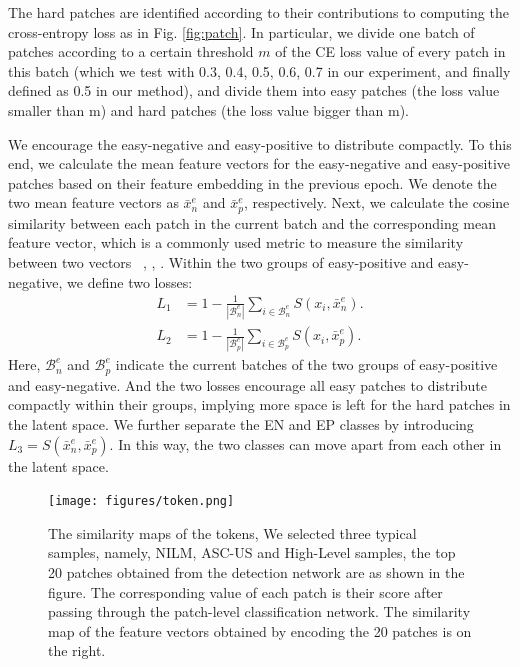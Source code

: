 The hard patches are identified according to their contributions to computing the cross-entropy loss as in Fig. \ref{fig:patch}. 
In particular, we divide one batch of patches according to a certain threshold $m$  of the CE loss value of every patch in this batch (which we test with 0.3, 0.4, 0.5, 0.6, 0.7 in our experiment, and finally defined as 0.5 in our method), and divide them into easy patches (the loss value smaller than m) and hard patches (the loss value bigger than m).

We encourage the easy-negative and easy-positive to distribute compactly. 
To this end, we calculate the mean feature vectors for the easy-negative and easy-positive patches based on their feature embedding in the previous epoch. 
We denote the two mean feature vectors as $\bar{x}^e_{n}$ and $\bar{x}^e_{p}$, respectively.
Next, we calculate the cosine similarity between each patch in the current batch and the corresponding mean feature vector, which is a commonly used metric to measure the similarity between two vectors ~\cite{nguyen2010cosine}, \cite{zhang2022whole}, \cite{cao2022parallel}. Within the two groups of easy-positive and easy-negative, we define two losses:
\begin{equation}
    \begin{aligned}
        L_{1}&=1-\frac{1}{|\mathcal{B}^e_{n}|}\sum_{i \in {\mathcal{B}^e_{n}}}  S( x_{i},\bar{x}^e_{n} ).\\
        L_{2}&=1-\frac{1}{|\mathcal{B}^e_{p}|}\sum_{i \in {\mathcal{B}^e_{p}}}  S( x_{i},\bar{x}^e_{p} ).
    \end{aligned}
\end{equation}
Here, $\mathcal{B}^e_{n}$ and $\mathcal{B}^e_{p}$ indicate the current batches of the two groups of easy-positive and easy-negative. 
And the two losses encourage all easy patches to distribute compactly within their groups, implying more space is left for the hard patches in the latent space.
We further separate the EN and EP classes by introducing $L_{3}=S(\bar{x}^e_{n},\bar{x}^e_{p})$. In this way, the two classes can move apart from each other in the latent space.
\begin{figure}[ht]
    \centering
    \texttt{[image: figures/token.png]}
    \caption{The similarity maps of the tokens, We selected three typical samples, namely, NILM, ASC-US and High-Level samples, the top 20 patches obtained from the detection network are as shown in the figure. The corresponding value of each patch is their score after passing through the patch-level classification network. The similarity map of the feature vectors obtained by encoding the 20 patches is on the right.}
    \label{fig:vit}
\end{figure}

